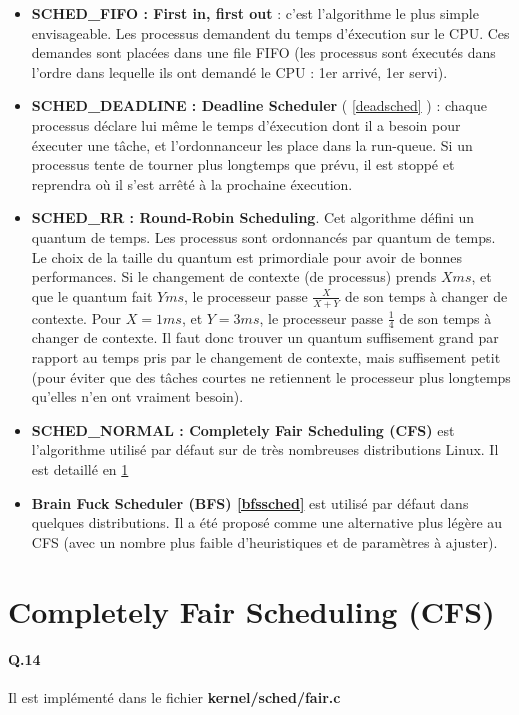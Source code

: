 \documentclass[10pt]{article}
\begin{document}
    \begin{itemize}
        \item \textbf{SCHED\_FIFO : First in, first out} : c'est l'algorithme le plus simple envisageable.
        Les processus demandent du temps d'éxecution sur le CPU.
        Ces demandes sont placées dans une file FIFO (les processus sont éxecutés
        dans l'ordre dans lequelle ils ont demandé le CPU : 1er arrivé, 1er servi).
        \item \textbf{SCHED\_DEADLINE : Deadline Scheduler} ( \ref{deadsched} ) : chaque processus déclare lui même le temps d'éxecution dont il a besoin pour éxecuter une tâche, et l'ordonnanceur les place dans la run-queue.
        Si un processus tente de tourner plus longtemps que prévu, il est stoppé et reprendra où il s'est arrêté à la prochaine éxecution.
        \item \textbf{SCHED\_RR : Round-Robin Scheduling}. Cet algorithme défini un quantum de temps.
        Les processus sont ordonnancés par quantum de temps. Le choix de la taille du quantum est primordiale pour avoir de bonnes performances. Si le changement de contexte (de processus) prends $X ms$, et que le quantum fait $Y ms$, le processeur
        passe $\frac{X}{X + Y}$ de son temps à changer de contexte. Pour $X=1ms$, et $Y=3ms$, le processeur passe $\frac{1}{4}$ de son temps à changer de contexte.
        Il faut donc trouver un quantum suffisement grand par rapport au temps pris par le changement de contexte, mais suffisement petit (pour éviter que des tâches courtes ne retiennent le processeur plus longtemps qu'elles n'en ont vraiment besoin).
        \item \textbf{SCHED\_NORMAL : Completely Fair Scheduling (CFS)} est l'algorithme
        utilisé par défaut sur de très nombreuses distributions Linux. Il est detaillé en \ref{cfs}
        \item \textbf{Brain Fuck Scheduler (BFS) \ref{bfssched}} est utilisé par défaut dans quelques distributions.
        Il a été proposé comme une alternative plus légère au CFS
        (avec un nombre plus faible d'heuristiques et de paramètres à ajuster).
    \end{itemize}

\newpage
\section{Completely Fair Scheduling (CFS)}\label{cfs}
  \paragraph{Q.14} Il est implémenté dans le fichier \textbf{kernel/sched/fair.c}
\end{document}
